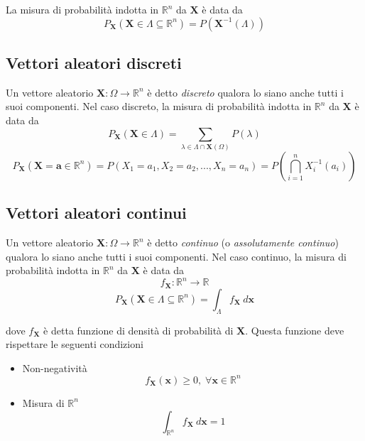         La misura di probabilità indotta in $\mathbb{R}^{n}$ da $\mathbf{X}$ è data da
        \[
            P_{\mathbf{X}}(\mathbf{X} \in \Lambda \subseteq \mathbb{R}^{n}) = P(\mathbf{X}^{-1}(\Lambda))
        \]

        \subsection{Vettori aleatori discreti}
            Un vettore aleatorio $\mathbf{X}: \Omega \rightarrow \mathbb{R}^{n}$ è detto \textit{discreto} qualora lo siano anche tutti i suoi componenti.
            Nel caso discreto, la misura di probabilità indotta in $\mathbb{R}^{n}$ da $\mathbf{X}$ è data da
            \[
                P_{\mathbf{X}}(\mathbf{X} \in \Lambda) = \sum_{\lambda \in \Lambda \cap \mathbf{X}(\Omega)} P(\lambda)
            \]
            \[
                P_{\mathbf{X}}(\mathbf{X} = \mathbf{a} \in \mathbb{R}^{n}) = P(X_{1} = a_{1}, X_{2} = a_{2}, ..., X_{n} = a_{n}) = P \left(\bigcap_{i = 1}^{n} X_{i}^{-1}(a_{i})\right)
            \]

        \subsection{Vettori aleatori continui}
            Un vettore aleatorio $\mathbf{X}: \Omega \rightarrow \mathbb{R}^{n}$ è detto \textit{continuo} (o \textit{assolutamente continuo}) qualora lo siano anche tutti i suoi componenti.
            Nel caso continuo, la misura di probabilità indotta in $\mathbb{R}^{n}$ da $\mathbf{X}$ è data da
            \[
                f_{\mathbf{X}}: \mathbb{R}^{n} \rightarrow \mathbb{R}
            \]
            \[
                P_{\mathbf{X}}(\mathbf{X} \in \Lambda \subseteq \mathbb{R}^{n}) = \int_{\Lambda} f_{\mathbf{X}} \: d\mathbf{x}
            \]

            dove $f_{\mathbf{X}}$ è detta funzione di densità di probabilità di $\mathbf{X}$.
            Questa funzione deve rispettare le seguenti condizioni
            \begin{itemize}
                \item Non-negatività
                \[
                    f_{\mathbf{X}}(\mathbf{x}) \geq 0, \; \forall \mathbf{x} \in \mathbb{R}^{n}
                \]
                \item Misura di $\mathbb{R}^{n}$
                \[
                    \int_{\mathbb{R}^{n}} f_{\mathbf{X}} \: d\mathbf{x} = 1
                \]
            \end{itemize}

